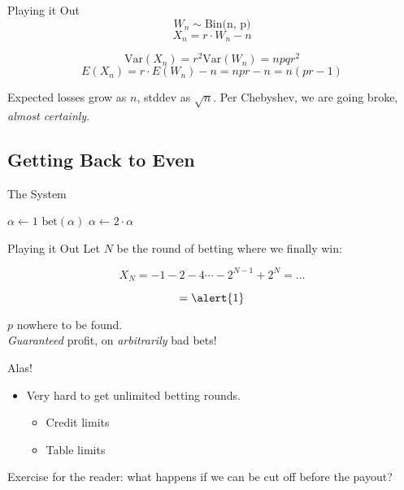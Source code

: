 \documentclass[pdf]{beamer}
\begin{document}
\begin{frame}{Playing it Out}
  \[ W_n \sim \text{Bin(n, p)} \]
  \[ X_n = r \cdot W_n - n\]

  \pause
  \[ \text{Var}(X_n) = r^2 \text{Var}(W_n) = npqr^2\]
  \[ E(X_n) = r\cdot E(W_n) - n = npr - n = n(pr -1) \]
  \pause

  Expected losses grow as $n$, stddev as $\sqrt{n}$. Per Chebyshev, we
are going broke, \emph{almost certainly}.
\end{frame}

\subsection{Getting Back to Even}
\begin{frame}{The System}
  \begin{algorithmic}
    \State $\alpha \gets 1$
      \State $\text{bet}(\alpha)$
        \State \Return
      \Else
        \State $\alpha \gets 2 \cdot \alpha$
      \EndIf
    \EndWhile
    \EndProcedure
  \end{algorithmic}
\end{frame}

\begin{frame}{Playing it Out}
  Let $N$ be the round of betting where we finally win:

  \[ X_N = -1 - 2 - 4 \cdots -2^{N-1} + 2^N = \ldots \]

  \pause
  \[ = \alert{1} \]

  \pause

  $p$ nowhere to be found.\\

  \pause
  \alert{\emph{Guaranteed}} profit, on \alert{\emph{arbitrarily}} bad bets!
\end{frame}

\begin{frame}{Alas!}
  \begin{itemize}
  \item Very hard to get unlimited betting rounds.
    \begin{itemize}
    \item Credit limits
    \item Table limits
    \end{itemize}
  \end{itemize}

  \pause
  Exercise for the reader: what happens if we can be cut off before the payout?
\end{frame}
\end{document}
